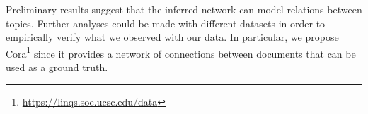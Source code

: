 Preliminary results suggest that the inferred network can 
model relations between topics. 
Further analyses could be made with different datasets in order to 
empirically verify what we observed with our data. 
In particular, we propose Cora\footnote{\url{https://linqs.soe.ucsc.edu/data}} 
since it provides a network of connections between documents that can be used as 
a ground truth.